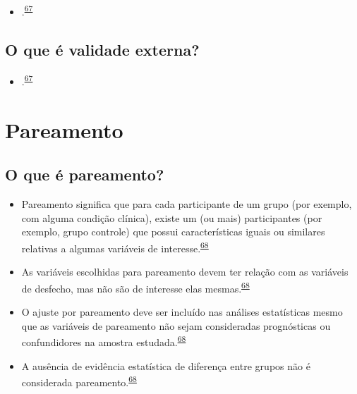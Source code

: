 \documentclass[
]{book}
\providecommand{\tightlist}{%
  \setlength{\itemsep}{0pt}\setlength{\parskip}{0pt}}
\begin{document}
\begin{itemize}
\tightlist
\item
  .\textsuperscript{\protect\hyperlink{ref-findley2021}{67}}
\end{itemize}

\hypertarget{o-que-uxe9-validade-externa}{%
\subsection{O que é validade externa?}\label{o-que-uxe9-validade-externa}}

\begin{itemize}
\tightlist
\item
  .\textsuperscript{\protect\hyperlink{ref-findley2021}{67}}
\end{itemize}

\hypertarget{pareamento}{%
\section{Pareamento}\label{pareamento}}

\hypertarget{o-que-uxe9-pareamento}{%
\subsection{O que é pareamento?}\label{o-que-uxe9-pareamento}}

\begin{itemize}
\item
  Pareamento significa que para cada participante de um grupo (por exemplo, com alguma condição clínica), existe um (ou mais) participantes (por exemplo, grupo controle) que possui características iguais ou similares relativas a algumas variáveis de interesse.\textsuperscript{\protect\hyperlink{ref-Bland1994}{68}}
\item
  As variáveis escolhidas para pareamento devem ter relação com as variáveis de desfecho, mas não são de interesse elas mesmas.\textsuperscript{\protect\hyperlink{ref-Bland1994}{68}}
\item
  O ajuste por pareamento deve ser incluído nas análises estatísticas mesmo que as variáveis de pareamento não sejam consideradas prognósticas ou confundidores na amostra estudada.\textsuperscript{\protect\hyperlink{ref-Bland1994}{68}}
\item
  A ausência de evidência estatística de diferença entre grupos não é considerada pareamento.\textsuperscript{\protect\hyperlink{ref-Bland1994}{68}}
\end{itemize}
\end{document}
